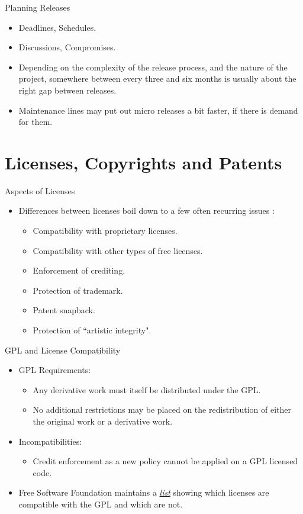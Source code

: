 \documentclass{beamer}
\begin{document}
\begin{frame}{Planning Releases}
\begin{itemize}
	\item Deadlines, Schedules. 
	\item Discussions, Compromises. 
	\item Depending on the complexity of the release process, and the nature of the project, somewhere between every three and six months is usually about the right gap between releases. 
	\item Maintenance lines may put out micro releases a bit faster, if there is demand for them. 
\end{itemize}
\end{frame}

\section{Licenses, Copyrights and Patents}
\begin{frame}{Aspects of Licenses}
\begin{itemize}
	\item Differences between licenses boil down to a few often recurring issues :
	\begin{itemize}
		\item Compatibility with proprietary licenses. 
		\item Compatibility with other types of free licenses. 
		\item Enforcement of crediting. 
		\item Protection of trademark. 
		\item Patent snapback. 
		\item Protection of ``artistic integrity". 
	\end{itemize}	
\end{itemize}
\end{frame}

\begin{frame}{GPL and License Compatibility}
\begin{itemize}
	\item GPL Requirements:
	\begin{itemize}
		\item  Any derivative work must itself be distributed under the GPL.
		\item No additional restrictions may be placed on the redistribution of either the original work or a derivative work. 
	\end{itemize}
	\item Incompatibilities: 
	\begin{itemize}
		\item Credit enforcement as a new policy cannot be applied on a GPL licensed code. 
	\end{itemize}
	\item Free Software Foundation maintains a \emph{\href{http://www.gnu.org/licenses/license-list.html}{list}} showing which licenses are compatible with the GPL and which are not.
\end{itemize}
\end{frame}
\end{document}
